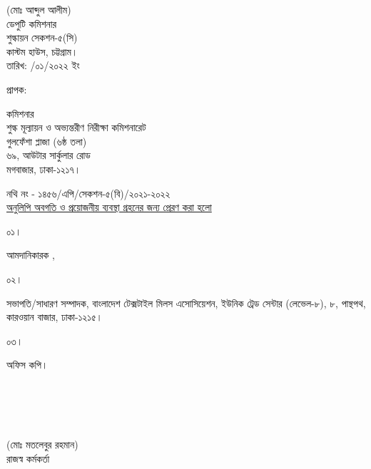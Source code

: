 \documentclass[12pt]{article}
\newcommand{\fileno}{নথি নং - ১৪৫৬/এপি/সেকশন-৫(বি)/২০২১-২০২২}
\newcommand{\impn}{\jsml}
\newcommand{\impadd}{\jsmla}
\newcommand{\rodt}{তারিখ: \hspace{2.0em}/০১/২০২২ ইং}
\begin{document}
\begin{minipage}[t]{0.60\linewidth}
\hspace{1em}
\end{minipage}
\begin{minipage}[t]{0.40\linewidth}
\begin{center}
(মোঃ আব্দুল আলীম)
\\
ডেপুটি কমিশনার
\\
শুল্কায়ন সেকশন-৫(সি)
\\
কাস্টম হাউস, চট্টগ্রাম।
\\
\footnotesize{{\rodt}}
\vspace*{5MM}
\end{center}
\end{minipage}
\begin{minipage}[t]{.07\linewidth}
প্রাপক:
\end{minipage}
\begin{minipage}[t]{.93\linewidth}
কমিশনার
\\
শুল্ক মূল্যায়ন ও অভ্যন্তরীণ নিরীক্ষা কমিশনারেট
\\
গুলফেঁশা প্লাজা (৬ষ্ঠ তলা)
\\
৬৯, আউটার সার্কুলার রোড
\\
মগবাজার, ঢাকা-১২১৭।
\\
\end{minipage}
\footnotesize{{\fileno}}
\\
\underline{\footnotesize{অনুলিপি অবগতি ও প্রয়োজনীয় ব্যবস্থা গ্রহনের জন্য প্রেরণ করা হলো}}
\\
\begin{minipage}[t]{0.06\linewidth}
\footnotesize{০১।}
\end{minipage}
\begin{minipage}[t]{0.94\linewidth}
\footnotesize{
আমদানিকারক {\impn}, {\impadd}
}
\end{minipage}
\begin{minipage}[t]{0.06\linewidth}
\footnotesize{০২।}
\end{minipage}
\begin{minipage}[t]{0.94\linewidth}
সভাপতি/সাধারণ সম্পাদক, বাংলাদেশ টেক্সটাইল
মিলস এসোসিয়েশন, ইউনিক ট্রেড সেন্টার (লেভেল-৮),
৮, পান্থপথ, কারওয়ান বাজার, ঢাকা-১২১৫।
\end{minipage}
\begin{minipage}[t]{0.06\linewidth}
\footnotesize{০৩।}
\end{minipage}
\begin{minipage}[t]{0.94\linewidth}
 অফিস কপি।
 \\
 \\
 \\
 \\
 \\
\end{minipage}
\begin{minipage}[t]{0.60\linewidth}
\hspace{1em}
\end{minipage}
\normalsize
\begin{minipage}[t]{0.40\linewidth}
\begin{center}
(মোঃ মতলেবুর রহমান)
\\
রাজস্ব কর্মকর্তা
\end{center}
\end{minipage}
\thispagestyle{slogan}
\end{document}
